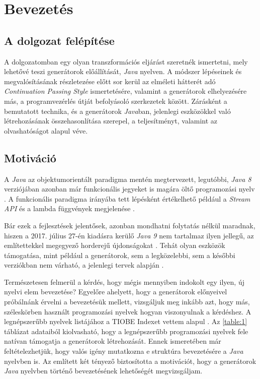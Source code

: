 \chapter{Bevezetés}

\section{A dolgozat felépítése}

A dolgozatomban egy olyan transzformációs eljárást szeretnék ismertetni, mely lehetővé teszi generátorok előállítását, \textit{Java} nyelven. A módszer lépéseinek és megvalósításának részletezése előtt sor kerül az elméleti hátterét adó \textit{Continuation Passing Style} ismertetésére, valamint a generátorok elhelyezésére más, a programvezérlés útját befolyásoló szerkezetek között. Zárásként a bemutatott technika, és a generátorok \textit{Java}ban, jelenlegi eszközökkel való létrehozásának összehasonlítása szerepel, a teljesítményt, valamint az olvashatóságot alapul véve.

\section{Motiváció}

A \textit{Java} az objektumorientált paradigma mentén megtervezett, legutóbbi, \textit{Java 8} verziójában azonban már funkcionális jegyeket is magára öltő programozási nyelv . A funkcionális paradigma irányába tett lépésként értékelhető például a \textit{Stream API} és a lambda függvények megjelenése \cite{Java8Features}. 

Bár ezek a fejlesztések jelentősek, azonban mondhatni folytatás nélkül maradnak, hiszen a 2017. július 27-én kiadásra kerülő \textit{Java 9} nem tartalmaz ilyen jellegű, az említettekkel megegyező horderejű újdonságokat \cite{Java9Features}. Tehát olyan eszközök támogatása, mint például a generátorok, sem a legközelebbi, sem a későbbi verziókban nem várható, a jelenlegi tervek alapján \cite{ProjectValhalla}.

Természetesen felmerül a kérdés, hogy mégis mennyiben indokolt egy ilyen, új nyelvi elem bevezetése? Egyelőre ahelyett, hogy a generátorok előnyeivel próbálnánk érvelni a bevezetésük mellett, vizsgáljuk meg inkább azt, hogy más, széleskörben használt programozási nyelvek hogyan viszonyulnak a kérdéshez. A legnépszerűbb nyelvek listájához a TIOBE Indexet vettem alapul \cite{TIOBEIndex}. Az \ref{table:1} táblázat adataiból kiolvasható, hogy a legnépszerűbb programozási nyelvek fele natívan támogatja a generátorok létrehozását. Ennek ismeretében már feltételezhetjük, hogy valós igény mutatkozna e struktúra bevezetésére a \textit{Java} nyelvben is. Az említett két tényező biztosította a motivációt, hogy a generátorok \textit{Java} nyelvben történő bevezetésének lehetőségét megvizsgáljam.

